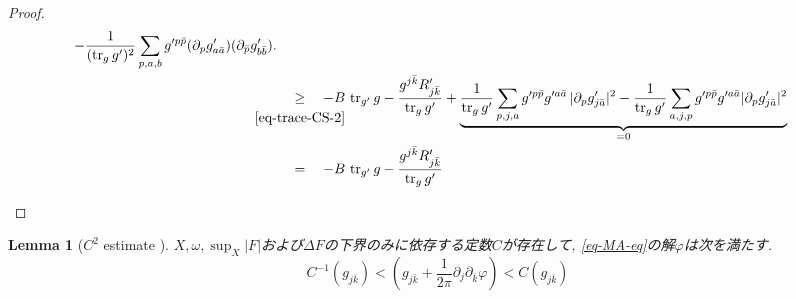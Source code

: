 \documentclass[dvipdfmx,a4paper,11pt]{article} %
\newtheorem{lem}[thm]{Lemma}
\theoremstyle{definition}
\theoremstyle{remark}
\numberwithin{equation}{section}
\newcommand{\underalign}[2]{%
  \quad
  \underset{\mathclap{\raisebox{-1.6ex}{\ensuremath{\scriptstyle #1}}}}{#2}
  \quad
}
\begin{document}
\begin{proof}
\begin{equation*}
\begin{aligned}
-\frac{1}{(\operatorname{tr}_g g')^2}\sum_{p,a,b} g'^{p\bar p}(\partial_p g'_{a\bar a})(\partial_{\bar p}g'_{b\bar b}).
\\
&\underalign{\eqref{eq-trace-CS-2}}{\geq}
-B\,\operatorname{tr}_{g'}g-\frac{g^{j\bar k}R'_{j\bar k}}{\operatorname{tr}_g g'}
+
\underbrace{
\frac{1}{\operatorname{tr}_g g'}\sum_{p,j,a} g'^{p\bar p}g'^{a\bar a}\,
\lvert\partial_p g'_{j\bar a}\rvert^2
-
\frac{1}{\operatorname{tr}_g g'}\sum_{a,j,p} g'^{p\bar p}g'^{a\bar a}\lvert\partial_p g'_{j\bar a}\rvert^2
}_{=0}
\\
&\underalign{}{=}
-B\,\operatorname{tr}_{g'}g-\frac{g^{j\bar k}R'_{j\bar k}}{\operatorname{tr}_g g'}
\end{aligned}
\end{equation*}
\end{proof}

\begin{lem}
[{$C^2$ estimate \cite[Lemma 3.8]{Sze14}}]
\label{lem-C2-estimate}
$X,\omega,\sup_X\lvert F\rvert$および$\Delta F$の下界のみに依存する定数$C$が存在して,
\eqref{eq-MA-eq}の解$\varphi$は次を満たす. 
\[
C^{-1}(g_{j\bar k})<\left(g_{j\bar k}+\frac{1}{2\pi}\partial_j\partial_{\bar k}\varphi\right)<C(g_{j\bar k})
\]
\end{lem}
\end{document}
